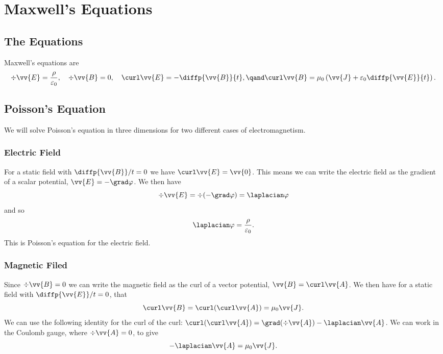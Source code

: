 \documentclass[fleqn]{NotesClass}
\begin{document}
    \chapter{Maxwell's Equations}
    \section{The Equations}
    Maxwell's equations are
    \begin{equation*}
        \div\vv{E} = \frac{\rho}{\varepsilon_0}, \quad \div\vv{B} = 0, \quad \curl\vv{E} = -\diffp{\vv{B}}{t}, \qand \curl\vv{B} = \mu_0\left( \vv{J} + \varepsilon_0\diffp{\vv{E}}{t} \right).
    \end{equation*}
    
    \section{Poisson's Equation}
    We will solve Poisson's equation in three dimensions for two different cases of electromagnetism.
    
    \subsection{Electric Field}
    For a static field with \(\diffp{\vv{B}}/{t} = 0\) we have \(\curl\vv{E} = \vv{0}\).
    This means we can write the electric field as the gradient of a scalar potential, \(\vv{E} = -\grad\varphi\).
    We then have
    \begin{equation}
        \div\vv{E} = \div(-\grad\varphi) = \laplacian\varphi
    \end{equation}
    and so
    \begin{equation}
        \laplacian\varphi = \frac{\rho}{\varepsilon_0}.
    \end{equation}
    This is Poisson's equation for the electric field.
    
    \subsection{Magnetic Filed}
    Since \(\div\vv{B} = 0\) we can write the magnetic field as the curl of a vector potential, \(\vv{B} = \curl\vv{A}\).
    We then have for a static field with \(\diffp{\vv{E}}/{t} = 0\), that
    \begin{equation}
        \curl\vv{B} = \curl(\curl\vv{A}) = \mu_0\vv{J}.
    \end{equation}
    We can use the following identity for the curl of the curl: \(\curl(\curl\vv{A}) = \grad(\div\vv{A}) - \laplacian\vv{A}\).
    We can work in the Coulomb gauge, where \(\div\vv{A} = 0\), to give
    \begin{equation}
        -\laplacian\vv{A} = \mu_0\vv{J}.
    \end{equation}
    
\end{document}

